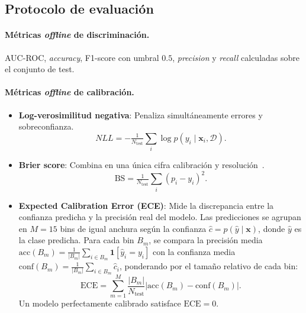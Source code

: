 \documentclass{article}
\begin{document}
\subsection{Protocolo de evaluaci\'on}
\label{sec:eval-protocol}
 
\paragraph{M\'etricas \emph{offline} de discriminaci\'on.}
AUC-ROC, \emph{accuracy}, F1-score con umbral $0.5$, \emph{precision} y \emph{recall} calculadas sobre el conjunto de test.

\paragraph{M\'etricas \emph{offline} de calibraci\'on.}

\begin{itemize}
  \item \textbf{Log-verosimilitud negativa}:
        Penaliza simult\'aneamente errores y sobreconfianza.
        \begin{equation}
            NLL=-\tfrac{1}{N_{\mathrm{test}}}\sum_{i}\log p(y_{i}\mid\mathbf{x}_{i},\mathcal{D}).
        \end{equation}
  \item \textbf{Brier score}:
        Combina en una \'unica cifra calibraci\'on y resoluci\'on~\citep{gneiting2007strictly}.
        \begin{equation}
            \mathrm{BS}=\tfrac{1}{N_{\mathrm{test}}}\sum_{i}(p_{i}-y_{i})^{2}.
        \end{equation}
  \item \textbf{Expected Calibration Error (ECE)}: Mide la discrepancia entre
        la confianza predicha y la precisión real del modelo. Las predicciones se
        agrupan en $M = 15$ bins de igual anchura según la confianza $\hat{c} = p(\hat{y} \mid \mathbf{x})$,
        donde $\hat{y}$ es la clase predicha. Para cada bin $B_m$, se compara
        la precisión media $\mathrm{acc}(B_m) = \frac{1}{|B_m|}\sum_{i \in B_m} \mathbf{1}[\hat{y}_i = y_i]$
        con la confianza media $\mathrm{conf}(B_m) = \frac{1}{|B_m|}\sum_{i \in B_m} \hat{c}_i$,
        ponderando por el tamaño relativo de cada bin:
        \begin{equation}
            \mathrm{ECE} = \sum_{m=1}^{M} \frac{|B_m|}{N_{\mathrm{test}}}
            \bigl|\mathrm{acc}(B_m) - \mathrm{conf}(B_m)\bigr|.
        \end{equation}
        Un modelo perfectamente calibrado satisface $\mathrm{ECE} = 0$.
\end{itemize}
\end{document}
